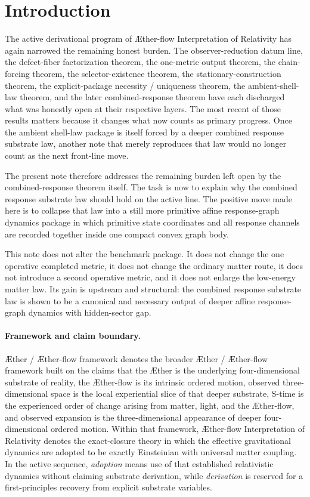 \documentclass[11pt]{article}
\newcommand{\Aether}{\AE{}ther}
\newcommand{\Aflow}{\AE{}ther-flow}
\newcommand{\TheoryName}{\Aflow{} Interpretation of Relativity}
\newcommand{\TheoryProgram}{\Aether{} / \Aflow{} framework}
\begin{document}
\section{Introduction}

The active derivational program of \TheoryName{} has again narrowed the remaining honest burden. The observer-reduction datum line, the defect-fiber factorization theorem, the one-metric output theorem, the chain-forcing theorem, the selector-existence theorem, the stationary-construction theorem, the explicit-package necessity / uniqueness theorem, the ambient-shell-law theorem, and the later combined-response theorem have each discharged what was honestly open at their respective layers. The most recent of those results matters because it changes what now counts as primary progress. Once the ambient shell-law package is itself forced by a deeper combined response substrate law, another note that merely reproduces that law would no longer count as the next front-line move.

The present note therefore addresses the remaining burden left open by the combined-response theorem itself. The task is now to explain why the combined response substrate law should hold on the active line. The positive move made here is to collapse that law into a still more primitive affine response-graph dynamics package in which primitive state coordinates and all response channels are recorded together inside one compact convex graph body.

This note does not alter the benchmark package. It does not change the one operative completed metric, it does not change the ordinary matter route, it does not introduce a second operative metric, and it does not enlarge the low-energy matter law. Its gain is upstream and structural: the combined response substrate law is shown to be a canonical and necessary output of deeper affine response-graph dynamics with hidden-sector gap.

\paragraph{Framework and claim boundary.}
\TheoryProgram{} denotes the broader \Aether{} / \Aflow{} framework built on the claims that the \Aether{} is the underlying four-dimensional substrate of reality, the \Aflow{} is its intrinsic ordered motion, observed three-dimensional space is the local experiential slice of that deeper substrate, S-time is the experienced order of change arising from matter, light, and the \Aflow{}, and observed expansion is the three-dimensional appearance of deeper four-dimensional ordered motion. Within that framework, \TheoryName{} denotes the exact-closure theory in which the effective gravitational dynamics are adopted to be exactly Einsteinian with universal matter coupling. In the active sequence, \emph{adoption} means use of that established relativistic dynamics without claiming substrate derivation, while \emph{derivation} is reserved for a first-principles recovery from explicit substrate variables.
\end{document}
